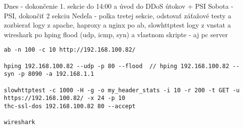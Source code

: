 \documentclass[12pt, a4paper]{article}
\begin{document}
Dnes - dokončenie 1. sekcie do 14:00
a úvod do DDoS útokov + PSI
Sobota - PSI, dokončiť 2 sekciu
Nedeľa - polka tretej sekcie, odstovať záťažové testy a zozbierať logy z apache, haproxy a nginx
po ab, slowhttptest
logy z vnstat a wireshark po hping flood (udp, icmp, syn) a vlastnom skripte - aj pc server
\begin{verbatim}
ab -n 100 -c 10 http://192.168.100.82/

hping 192.168.100.82 --udp -p 80 --flood  // hping 192.168.100.82 --syn -p 8090 -a 192.168.1.1

slowhttptest -c 1000 -H -g -o my_header_stats -i 10 -r 200 -t GET -u https://192.168.100.82/ -x 24 -p 10
thc-ssl-dos 192.168.100.82 80 --accept

wireshark
\end{verbatim}

\printbibliography[title={Literatúra}]
\end{document}
